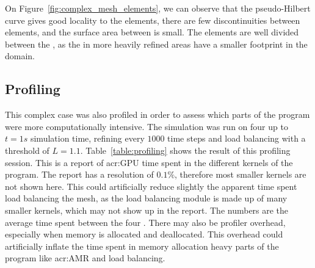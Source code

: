 On Figure~\ref{fig:complex_mesh_elements}, we can observe that the pseudo-Hilbert curve gives good
locality to the elements, there are few discontinuities between elements, and the surface area
between  is small. The elements are well divided between the
, as the  in more heavily refined areas have a smaller
footprint in the domain.

\subsection{Profiling}\label{subsection:results:complex_meshes:profiling}

This complex case was also profiled in order to assess which parts of the program were more
computationally intensive. The simulation was run on four  up to \(t = 1 s\)
simulation time, refining every \(1000\) time steps and load balancing with a threshold of \(L =
1.1\). Table~\ref{table:profiling} shows the result of this profiling session. This is a report of
\acrshort{acr:GPU} time spent in the different kernels of the program. The report has a resolution
of \(0.1 \% \), therefore most smaller kernels are not shown here. This could artificially reduce
slightly the apparent time spent load balancing the mesh, as the load balancing module is made up of
many smaller kernels, which may not show up in the report. The numbers are the average time spent
between the four . There may also be profiler overhead, especially when memory
is allocated and deallocated. This overhead could artificially inflate the time spent in memory
allocation heavy parts of the program like \acrshort{acr:AMR} and load balancing.

